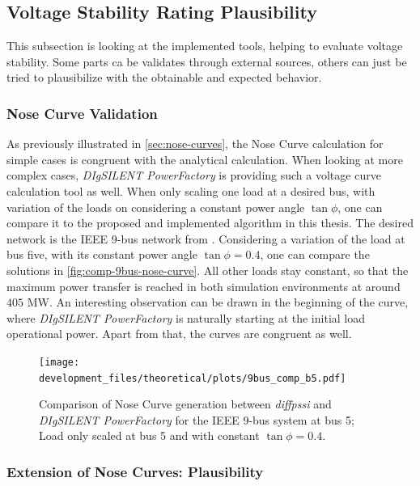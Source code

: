 \subsection{Voltage Stability Rating Plausibility}

This subsection is looking at the implemented tools, helping to evaluate voltage stability.
Some parts ca be validates through external sources, others can just be tried to plausibilize with the obtainable and expected behavior. 

\subsubsection{Nose Curve Validation}

As previously illustrated in \autoref{sec:nose-curves}, the Nose Curve calculation for simple cases is congruent with the analytical calculation.
When looking at more complex cases, \textit{DIgSILENT PowerFactory} is providing such a voltage curve calculation tool as well.
When only scaling one load at a desired bus, with variation of the loads on considering a constant power angle $\tan \phi$, one can compare it to the proposed and implemented algorithm in this thesis.
The desired network is the IEEE 9-bus network from \autocite{anderson_2003}.
Considering a variation of the load at bus five, with its constant power angle $\tan \phi = 0.4$, one can compare the solutions in \autoref{fig:comp-9bus-nose-curve}.
All other loads stay constant, so that the maximum power transfer is reached in both simulation environments at around $405$ MW.
An interesting observation can be drawn in the beginning of the curve, where \textit{DIgSILENT PowerFactory} is naturally starting at the initial load operational power.
Apart from that, the curves are congruent as well.

\begin{figure}[htbp!]
    \centering
    \texttt{[image: development\_files/theoretical/plots/9bus\_comp\_b5.pdf]}
    \caption[Comparison of Nose Curve generation between \textit{diffpssi} and \textit{DIgSILENT PowerFactory} for the IEEE 9-bus system]{Comparison of Nose Curve generation between \textit{diffpssi} and \textit{DIgSILENT PowerFactory} for the IEEE 9-bus system at bus 5; Load only scaled at bus 5 and with constant $\tan \phi = 0.4$.}
    \label{fig:comp-9bus-nose-curve}
\end{figure}

\subsubsection{Extension of Nose Curves: Plausibility}

